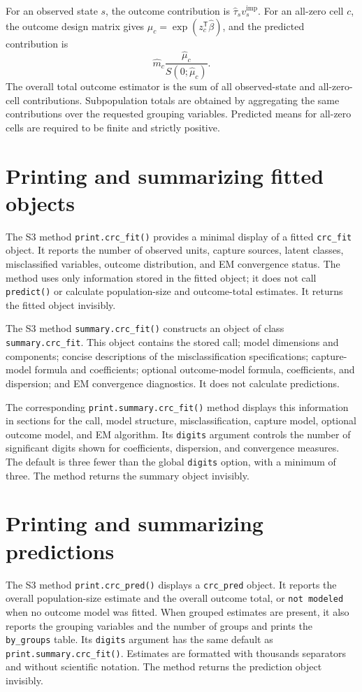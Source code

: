 \documentclass[11pt,letterpaper]{article}
\begin{document}
For an observed state $s$, the outcome contribution is
$\widehat\tau_s v_s^{\mathrm{imp}}$. For an all-zero cell $c$, the outcome
design matrix gives $\widehat\mu_c=\exp(z_c^{\mathsf T}\widehat\beta)$, and
the predicted contribution is
\[
  \widehat m_c\frac{\widehat\mu_c}{S(0;\widehat\mu_c)}.
\]
The overall total outcome estimator is the sum of all observed-state and
all-zero-cell contributions. Subpopulation totals are obtained by aggregating
the same contributions over the requested grouping variables. Predicted means
for all-zero cells are required to be finite and strictly positive.

\section{Printing and summarizing fitted objects}

The S3 method \texttt{print.crc\_fit()} provides a minimal display of a fitted
\texttt{crc\_fit} object. It reports the number of observed units, capture
sources, latent classes, misclassified variables, outcome distribution, and EM
convergence status. The method uses only information stored in the fitted
object; it does not call \texttt{predict()} or calculate population-size and
outcome-total estimates. It returns the fitted object invisibly.

The S3 method \texttt{summary.crc\_fit()} constructs an object of class
\texttt{summary.crc\_fit}. This object contains the stored call; model
dimensions and components; concise descriptions of the misclassification
specifications; capture-model formula and coefficients; optional outcome-model
formula, coefficients, and dispersion; and EM convergence diagnostics. It
does not calculate predictions.

The corresponding \texttt{print.summary.crc\_fit()} method displays this
information in sections for the call, model structure, misclassification,
capture model, optional outcome model, and EM algorithm. Its \texttt{digits}
argument controls the number of significant digits shown for coefficients,
dispersion, and convergence measures. The default is three fewer than the
global \texttt{digits} option, with a minimum of three. The method returns the
summary object invisibly.

\section{Printing and summarizing predictions}

The S3 method \texttt{print.crc\_pred()} displays a \texttt{crc\_pred} object.
It reports the overall population-size estimate and the overall outcome total,
or \texttt{not modeled} when no outcome model was fitted. When grouped
estimates are present, it also reports the grouping variables and the number
of groups and prints the \texttt{by\_groups} table. Its \texttt{digits}
argument has the same default as \texttt{print.summary.crc\_fit()}. Estimates
are formatted with thousands separators and without scientific notation. The
method returns the prediction object invisibly.
\end{document}
